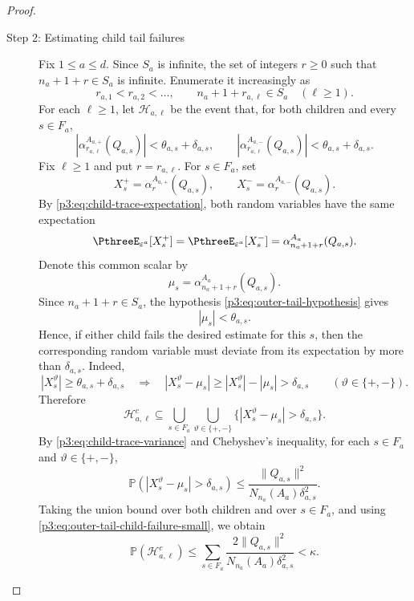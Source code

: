 \documentclass[11pt,reqno]{amsart}
\makeatletter
\theoremstyle{plain}
\theoremstyle{definition}
\newcounter{problempaper}
\newenvironment{problempaperbody}{%
  \setcounter{subsection}{0}%
  \setcounter{subsubsection}{0}%
  \setcounter{paragraph}{0}%
  \renewcommand{\thesubsection}{\arabic{subsection}}%
  \renewcommand{\thesubsubsection}{\thesubsection.\arabic{subsubsection}}%
  \renewcommand{\theparagraph}{\thesubsubsection.\arabic{paragraph}}%
  \let\problem@outersection\section
  \let\problem@outersubsection\subsection
  \let\problem@outersubsubsection\subsubsection
  \let\problem@outerparagraph\paragraph
  \let\section\problem@papersection
  \let\subsection\problem@papersubsection
  \let\subsubsection\problem@papersubsubsection
}{%
  \let\section\problem@outersection
  \let\subsection\problem@outersubsection
  \let\subsubsection\problem@outersubsubsection
  \let\paragraph\problem@outerparagraph
}
\newcommand{\problem@target}[2]{%
  \hypertarget{problem-\theproblempaper-#1-#2}{}%
}
\newcommand{\problem@paperheading}[3]{%
  \par\bigskip
  \problem@target{#1}{#2}%
  \noindent{\large\bfseries #2.\quad #3\par}%
  \nobreak\smallskip
}
\newcommand{\problem@papersubheading}[3]{%
  \par\medskip
  \problem@target{#1}{#2}%
  \noindent{\normalsize\bfseries #2.\quad #3\par}%
  \nobreak\smallskip
}
\newcommand{\problem@papersubsubheading}[3]{%
  \par\smallskip
  \problem@target{#1}{#2}%
  \noindent{\normalsize\itshape #2.\quad #3.\ }%
}
\def\problem@papersection{%
  \@ifstar{\problem@papersectionstar}{\problem@papersectionnostar}%
}
\def\problem@papersectionstar#1{%
  \par\bigskip\noindent{\large\bfseries #1\par}\nobreak\smallskip
}
\def\problem@papersectionnostar#1{%
  \refstepcounter{subsection}%
  \setcounter{subsubsection}{0}%
  \setcounter{paragraph}{0}%
  \problem@paperheading{section}{\thesubsection}{#1}%
  \problem@writecontentsline{section}{\thesubsection}{#1}%
}
\def\problem@papersubsection{%
  \@ifstar{\problem@papersubsectionstar}{\problem@papersubsectionnostar}%
}
\def\problem@papersubsectionstar#1{%
  \par\medskip\noindent{\normalsize\bfseries #1\par}\nobreak\smallskip
}
\def\problem@papersubsectionnostar#1{%
  \refstepcounter{subsubsection}%
  \setcounter{paragraph}{0}%
  \problem@papersubheading{subsection}{\thesubsubsection}{#1}%
  \problem@writecontentsline{subsection}{\thesubsubsection}{#1}%
}
\def\problem@papersubsubsection{%
  \@ifstar{\problem@papersubsubsectionstar}{\problem@papersubsubsectionnostar}%
}
\def\problem@papersubsubsectionstar#1{%
  \par\smallskip\noindent{\normalsize\itshape #1.\ }%
}
\def\problem@papersubsubsectionnostar#1{%
  \refstepcounter{paragraph}%
  \problem@papersubsubheading{subsubsection}{\theparagraph}{#1}%
  \problem@writecontentsline{subsubsection}{\theparagraph}{#1}%
}
\newcommand{\problem@writecontentsline}[3]{%
  \begingroup
  \protected@write\@auxout{}{%
    \string\problemcontentsentry{\theproblempaper}{#1}{#2}{#3}{\thepage}%
  }%
  \endgroup
}
\newcommand{\problemcontentsentry}[5]{%
  \@ifundefined{problemcontents@#1}{%
    \expandafter\gdef\csname problemcontents@#1\endcsname{}%
  }{}%
  \expandafter\g@addto@macro\csname problemcontents@#1\endcsname{%
    \problemcontentsline{#1}{#2}{#3}{#4}{#5}%
  }%
}
\newcommand{\problemcontentslink}[4]{%
  \hyperlink{problem-#1-#2-#3}{#4}%
}
\newcommand{\problemcontentsline}[5]{%
  \ifstrequal{#2}{section}{%
    \par\noindent
    \problemcontentslink{#1}{#2}{#3}{\makebox[2.5em][l]{#3}#4}%
    \nobreak\dotfill
    \problemcontentslink{#1}{#2}{#3}{#5}\par
  }{%
    \ifstrequal{#2}{subsection}{%
      \par\noindent\hspace*{1.5em}%
      \problemcontentslink{#1}{#2}{#3}{\makebox[3.5em][l]{#3}#4}%
      \nobreak\dotfill
      \problemcontentslink{#1}{#2}{#3}{#5}\par
    }{%
      \par\noindent\hspace*{3em}%
      \problemcontentslink{#1}{#2}{#3}{\makebox[4.5em][l]{#3}#4}%
      \nobreak\dotfill
      \problemcontentslink{#1}{#2}{#3}{#5}\par
    }%
  }%
}
\makeatother
\begin{document}
\begin{problempaperbody}
\begin{proof}
\begin{description}
\item[\textup{Step 2: Estimating child tail failures}]
Fix $1\leq a\leq d$. Since $S_a$ is infinite, the set of integers $r\geq0$ such that $n_a+1+r\in S_a$ is infinite. Enumerate it increasingly as
\begin{equation*}
        r_{a,1}<r_{a,2}<\ldots,\qquad n_a+1+r_{a,\ell}\in S_a\quad(\ell\geq1).
\end{equation*}
For each $\ell\geq1$, let $\mathcal H_{a,\ell}$ be the event that, for both children and every $s\in F_a$,
\begin{equation*}
        |\alpha_{r_{a,\ell}}^{A_{a,+}}(Q_{a,s})|<\theta_{a,s}+\delta_{a,s},\qquad |\alpha_{r_{a,\ell}}^{A_{a,-}}(Q_{a,s})|<\theta_{a,s}+\delta_{a,s}.
\end{equation*}
Fix $\ell\geq1$ and put $r=r_{a,\ell}$. For $s\in F_a$, set
\begin{equation*}
        X_s^+=\alpha_r^{A_{a,+}}(Q_{a,s}),\qquad X_s^-=\alpha_r^{A_{a,-}}(Q_{a,s}).
\end{equation*}
By \eqref{p3:eq:child-trace-expectation}, both random variables have the same expectation
\begin{equation*}
        \PthreeE_{\varepsilon^a}[X_s^+]=\PthreeE_{\varepsilon^a}[X_s^-]=\alpha_{n_a+1+r}^{A_a}(Q_{a,s}).
\end{equation*}
Denote this common scalar by
\begin{equation*}
        \mu_s=\alpha_{n_a+1+r}^{A_a}(Q_{a,s}).
\end{equation*}
Since $n_a+1+r\in S_a$, the hypothesis \eqref{p3:eq:outer-tail-hypothesis} gives
\begin{equation*}
        |\mu_s|<\theta_{a,s}.
\end{equation*}
Hence, if either child fails the desired estimate for this $s$, then the corresponding random variable must deviate from its expectation by more than $\delta_{a,s}$. Indeed,
\begin{equation*}
        |X_s^\vartheta|\geq\theta_{a,s}+\delta_{a,s}\quad\Longrightarrow\quad |X_s^\vartheta-\mu_s|\geq |X_s^\vartheta|-|\mu_s|>\delta_{a,s}\qquad(\vartheta\in\{+,-\}).
\end{equation*}
Therefore
\begin{equation*}
        \mathcal H_{a,\ell}^c\subseteq\bigcup_{s\in F_a}\bigcup_{\vartheta\in\{+,-\}}\{|X_s^\vartheta-\mu_s|>\delta_{a,s}\}.
\end{equation*}
By \eqref{p3:eq:child-trace-variance} and Chebyshev's inequality, for each $s\in F_a$ and $\vartheta\in\{+,-\}$,
\begin{equation*}
        \mathbb P(|X_s^\vartheta-\mu_s|>\delta_{a,s})\leq\frac{\|Q_{a,s}\|^2}{N_{n_a}(A_a)\delta_{a,s}^2}.
\end{equation*}
Taking the union bound over both children and over $s\in F_a$, and using \eqref{p3:eq:outer-tail-child-failure-small}, we obtain
\begin{equation*}
        \mathbb P(\mathcal H_{a,\ell}^c)\leq \sum_{s\in F_a}\frac{2\|Q_{a,s}\|^2}{N_{n_a}(A_a)\delta_{a,s}^2}<\kappa.
\end{equation*}


\end{description}
\end{proof}
\end{problempaperbody}
\end{document}
